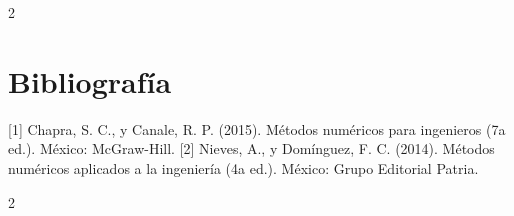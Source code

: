 \documentclass{rmf-d}
\begin{document}
\begin{multicols}{2}
\section{Bibliografía}

[1] Chapra, S. C., y Canale, R. P. (2015). Métodos numéricos para ingenieros (7a ed.). México: McGraw-Hill. 
[2] Nieves, A., y Domínguez, F. C. (2014). Métodos numéricos aplicados a la ingeniería (4a ed.). México: Grupo Editorial Patria. 
























\end{multicols}
\medline
\begin{multicols}{2}

    



\end{multicols}
\end{document}
